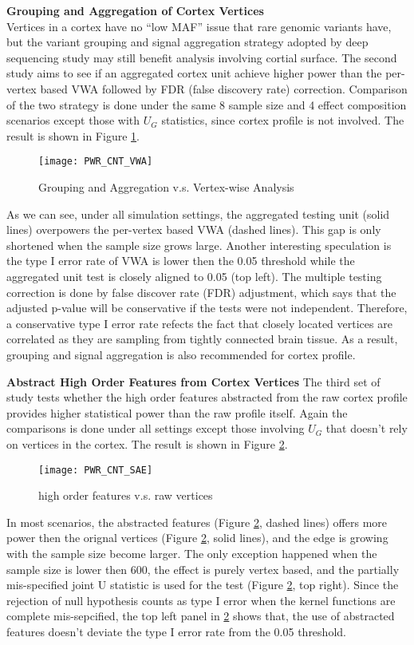 \noindent \textbf{Grouping and Aggregation of Cortex Vertices} \\
Vertices in a cortex have no ``low MAF'' issue that rare genomic variants have, but the variant grouping and signal aggregation strategy adopted by deep sequencing study may still benefit analysis involving cortial surface. The second study aims to see if an aggregated cortex unit achieve higher power than the per-vertex based VWA followed by FDR (false discovery rate) correction. Comparison of the two strategy is done under the same 8 sample size and 4 effect composition scenarios except those with $U_G$ statistics, since cortex profile is not involved. The result is shown in Figure \ref{fig:PWR_CNT_VWA}.
\begin{figure}[!htbp]
\label{fig:PWR_CNT_VWA}
\centering
\texttt{[image: PWR\_CNT\_VWA]}
\caption{Grouping and Aggregation v.s. Vertex-wise Analysis}
\end{figure}
As we can see, under all simulation settings, the aggregated testing unit (solid lines) overpowers the per-vertex based VWA (dashed lines). This gap is only shortened when the sample size grows large. Another interesting speculation is the type I error rate of VWA is lower then the 0.05 threshold while the aggregated unit test is closely aligned to 0.05 (top left). The multiple testing correction is done by false discover rate (FDR) adjustment, which says that the adjusted p-value will be conservative if the tests were not independent. Therefore, a conservative type I error rate refects the fact that closely located vertices are correlated as they are sampling from tightly connected brain tissue. As a result, grouping and signal aggregation is also recommended for cortex profile.

\noindent \textbf{Abstract High Order Features from Cortex Vertices}
The third set of study tests whether the high order features abstracted from the raw cortex profile provides higher statistical power than the raw profile itself. Again the comparisons is done under all settings except those involving $U_G$ that doesn't rely on vertices in the cortex. The result is shown in Figure \ref{fig:PWR_CNT_SAE}.
\begin{figure}[!htbp]
\label{fig:PWR_CNT_SAE}
\centering
\texttt{[image: PWR\_CNT\_SAE]}
\caption{high order features v.s. raw vertices}
\end{figure}
In most scenarios, the abstracted features (Figure \ref{fig:PWR_CNT_SAE}, dashed lines) offers more power then the orignal vertices (Figure \ref{fig:PWR_CNT_SAE}, solid lines), and the edge is growing with the sample size become larger. The only exception happened when the sample size is lower then 600, the effect is purely vertex based, and the partially mis-specified joint U statistic is used for the test (Figure \ref{fig:PWR_CNT_SAE}, top right). Since the rejection of null hypothesis counts as type I error when the kernel functions are complete mis-sepcified, the top left panel in \ref{fig:PWR_CNT_SAE} shows that, the use of abstracted features doesn't deviate the type I error rate from the 0.05 threshold.


